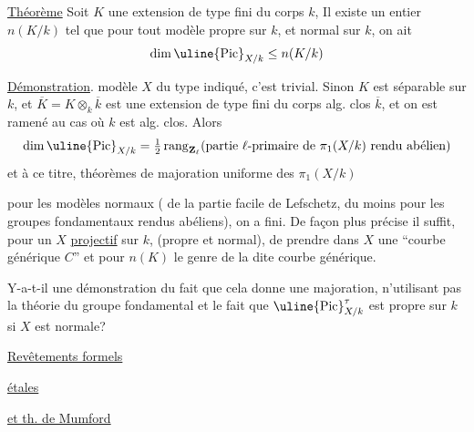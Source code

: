 \uline{Théorème} Soit $K$ une extension de type fini du
corps $k$, 
 Il
existe un entier $n(K/k)$
tel que pour tout modèle  propre sur $k$, et
normal sur $k$,  on ait 
\[
\dim\uline{\mathrm{Pic}}_{X/k}\leq n(K/k)
\]

\uline{Démonstration}. 
modèle $X$ du type indiqué, c'est trivial.
Sinon $K$ est séparable sur $k$, et
$\overline K=K\otimes_k\overline k$ est une extension de type
fini du corps alg. clos $\overline k$, et on
est ramené au cas où $k$ est alg. clos.
Alors
\[
\dim\uline{\mathrm{Pic}}_{X/k}
=\tfrac12\operatorname{rang}_{\mathbf Z_\ell}
(\text{partie $\ell$-primaire de }\pi_1(X/k)\text{ rendu abélien})
\]
et à ce titre,  théorèmes
de majoration uniforme des $\pi_1(X/k)$

pour les modèles normaux ( de
la partie facile de Lefschetz, du moins pour
les groupes fondamentaux rendus abéliens),
on a fini. De façon plus précise
il suffit, pour un  $X$ \uline{projectif} sur $k$,
(propre et normal), de prendre dans $X$
une ``courbe générique $C$'' et pour
$n(K)$ le genre de la dite courbe
générique.


Y-a-t-il une démonstration du fait
que cela donne une majoration, n'utilisant
pas la théorie du groupe fondamental
et le fait que $\uline{\mathrm{Pic}}^\tau_{X/k}$ est propre sur $k$
si $X$ est normale?


\uline{Revêtements formels}

\uline{étales}

\uline{et th. de Mumford}

